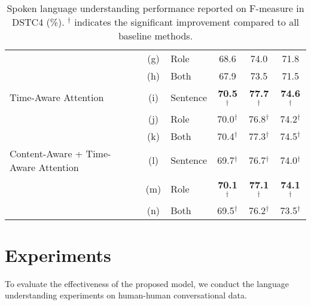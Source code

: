 \documentclass{article}
\begin{document}
\begin{table*}
\begin{tabular}{ | l c l | c | c | c | }
    & (g) & Role & 68.6 & 74.0 & 71.8\\
    & (h) & Both & 67.9 & 73.5 & 71.5\\\hline
    Time-Aware Attention & (i) & Sentence & \bf 70.5$^\dag$ & \bf 77.7$^\dag$  & \bf 74.6$^\dag$ \\
    & (j) & Role & 70.0$^\dag$  & 76.8$^\dag$  & 74.2$^\dag$ \\
    & (k) & Both & 70.4$^\dag$  & 77.3$^\dag$  & 74.5$^\dag$ \\\hline
    Content-Aware + Time-Aware Attention & (l) & Sentence & 69.7$^\dag$  & 76.7$^\dag$  & 74.0$^\dag$ \\
    & (m) & Role & \bf 70.1$^\dag$  & \bf 77.1$^\dag$  & \bf 74.1$^\dag$ \\
    & (n) & Both & 69.5$^\dag$  & 76.2$^\dag$  & 73.5$^\dag$ \\
    \hline
  \end{tabular}
  
\caption{Spoken language understanding performance reported on F-measure in DSTC4 (\%). $^\dag$ indicates the significant improvement compared to all baseline methods.}
\label{tab:res}
\end{table*}

\section{Experiments}
\label{sec:experiments}
To evaluate the effectiveness of the proposed model, we conduct the language understanding experiments on human-human conversational data.
\end{document}
